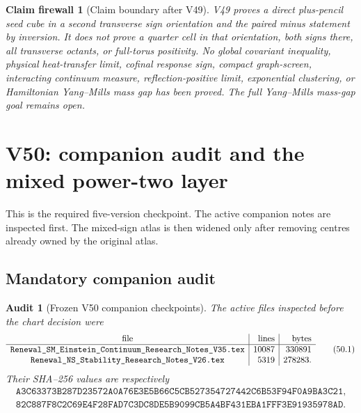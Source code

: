 \documentclass[11pt,oneside]{article}
\newtheorem{firewall}[theorem]{Claim firewall}
\newtheorem{audit}[theorem]{Audit}
\theoremstyle{definition}
\theoremstyle{remark}
\begin{document}
\begin{firewall}[Claim boundary after V49]
\label{fire:newv49-final}
V49 proves a direct plus-pencil seed cube in a second transverse
sign orientation and the paired minus statement by inversion.  It
does not prove a quarter cell in that orientation, both signs there,
all transverse octants, or full-torus positivity.  No global
covariant inequality, physical heat-transfer limit, cofinal
response sign, compact graph-screen, interacting continuum measure,
reflection-positive limit, exponential clustering, or Hamiltonian
Yang--Mills mass gap has been proved.  The full Yang--Mills
mass-gap goal remains open.
\end{firewall}

\section{V50: companion audit and the mixed power-two layer}
\label{sec:newv50-audit-mixed-layer}

This is the required five-version checkpoint.  The active companion
notes are inspected first.  The mixed-sign atlas is then widened
only after removing centres already owned by the original atlas.

\subsection{Mandatory companion audit}

\begin{audit}[Frozen V50 companion checkpoints]
\label{aud:newv50-companions}
The active files inspected before the chart decision were
\[
\begin{array}{c|r|r}
\hbox{file}&\hbox{lines}&\hbox{bytes}\\ \hline
\texttt{Renewal\_SM\_Einstein\_Continuum\_Research\_Notes\_V35.tex}
 &10087&330891\\
\texttt{Renewal\_NS\_Stability\_Research\_Notes\_V26.tex}
 &5319&278283.
\end{array}                                             \tag{50.1}
\]
Their SHA--256 values are respectively
\[
\begin{gathered}
\texttt{A3C63373B287D23572A0A76E3E5B66C5CB527354727442C6B53F94F0A9BA3C21},\\
\texttt{82C887F8C2C69E4F28FAD7C3DC8DE5B9099CB5A4BF431EBA1FFF3E91935978AD}.
\end{gathered}                                         \tag{50.2}
\]
\end{audit}
\end{document}
